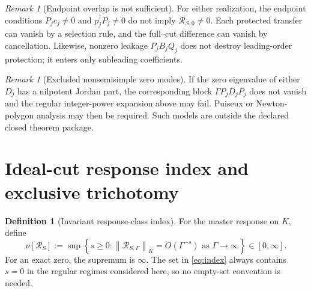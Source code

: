\documentclass[11pt]{article}
\theoremstyle{definition}
\newtheorem{definition}[theorem]{Definition}
\theoremstyle{remark}
\newtheorem{remark}[theorem]{Remark}
\theoremstyle{plain}
\newcommand{\R}{\mathcal R}
\newcommand{\normK}[1]{\left\lVert #1\right\rVert_{K}}
\begin{document}
\begin{remark}[Endpoint overlap is not sufficient]
For either realization, the endpoint conditions $P_jc_j\ne0$ and $p_j^\dagger P_j\ne0$ do not imply $\R_{S,0}\ne0$.  Each protected transfer can vanish by a selection rule, and the full--cut difference can vanish by cancellation.  Likewise, nonzero leakage $P_jB_jQ_j$ does not destroy leading-order protection; it enters only subleading coefficients.
\end{remark}

\begin{remark}[Excluded nonsemisimple zero modes]
If the zero eigenvalue of either $D_j$ has a nilpotent Jordan part, the corresponding block $\Gamma P_jD_jP_j$ does not vanish and the regular integer-power expansion above may fail.  Puiseux or Newton-polygon analysis may then be required.  Such models are outside the declared closed theorem package.
\end{remark}

\section{Ideal-cut response index and exclusive trichotomy}

\begin{definition}[Invariant response-class index]\label{def:index}
For the master response on $K$, define
\begin{equation}\label{eq:index}
 \boxed{
 \nu[\R_S]
 :=\sup\left\{s\ge0:\normK{\R_{S,\Gamma}}=O(\Gamma^{-s})
 \text{ as }\Gamma\to\infty\right\}\in[0,\infty].}
\end{equation}
For an exact zero, the supremum is $\infty$.  The set in \eqref{eq:index} always contains $s=0$ in the regular regimes considered here, so no empty-set convention is needed.
\end{definition}
\end{document}
